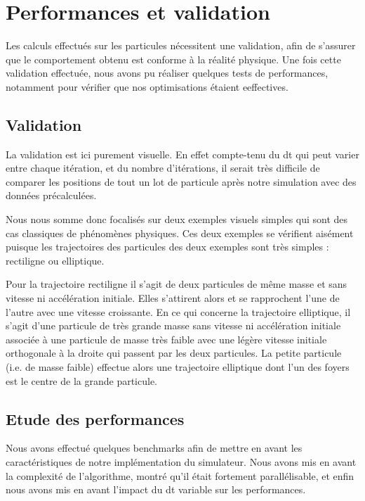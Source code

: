 \section{Performances et validation}

Les calculs effectués sur les particules nécessitent une validation, afin de s'assurer que le comportement obtenu est conforme à la réalité physique. Une fois cette validation effectuée, nous avons pu réaliser quelques tests de performances, notamment pour vérifier que nos optimisations étaient eeffectives.

\subsection{Validation}

La validation est ici purement visuelle. En effet compte-tenu du dt qui peut varier entre chaque itération, et du nombre d'itérations, il  serait très difficile de comparer les positions de tout un lot de particule après notre simulation avec des données précalculées.

Nous nous somme donc focalisés sur deux exemples visuels simples qui sont des cas classiques de phénomènes physiques. Ces deux exemples se vérifient aisément puisque les trajectoires des particules des deux exemples sont très simples : rectiligne ou elliptique.

Pour la trajectoire rectiligne il s'agit de deux particules de même masse et sans vitesse ni accélération initiale. Elles s'attirent alors et se rapprochent l'une de l'autre avec une vitesse croissante. En ce qui concerne la trajectoire elliptique, il s'agit d'une particule de très grande masse sans vitesse ni accélération initiale associée à une particule de masse très faible avec une légère vitesse initiale orthogonale à la droite qui passent par les deux particules. La petite particule (i.e. de masse faible) effectue alors une trajectoire elliptique dont l'un des foyers est le centre de la grande particule.

\subsection{Etude des performances}

Nous avons effectué quelques benchmarks afin de mettre en avant les caractéristiques de notre implémentation du simulateur. Nous avons mis en avant la complexité de l'algorithme, montré qu'il était fortement parallélisable, et enfin nous avons mis en avant l'impact du dt variable sur les performances.

